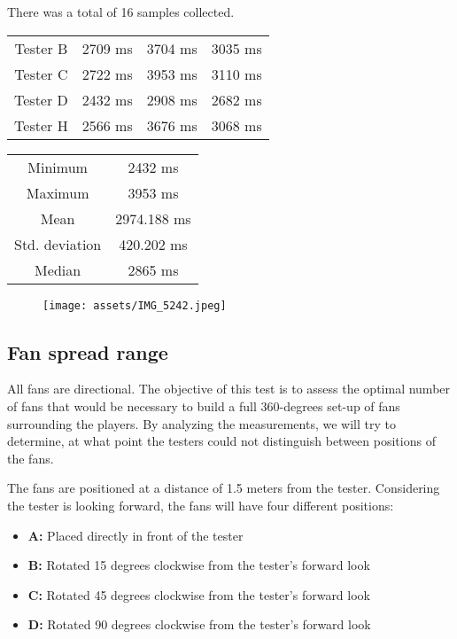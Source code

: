 There was a total of 16 samples collected.


\begin{center}
\begin{tabular}{|c|c|c|c|}
\hline
Tester B & 2709 ms & 3704 ms & 3035 ms \\ 
Tester C & 2722 ms & 3953 ms & 3110 ms \\ 
Tester D & 2432 ms & 2908 ms & 2682 ms \\ 
Tester H & 2566 ms & 3676 ms & 3068 ms \\ 
\hline
\end{tabular}
\end{center}

\begin{center}
\begin{tabular}{|c|c|}
\hline
Minimum & 2432 ms \\ 
Maximum & 3953 ms \\ 
Mean & 2974.188 ms \\ 
Std. deviation & 420.202 ms \\ 
Median & 2865 ms \\ 
\hline
\end{tabular}
\end{center}

\begin{figure}[h]{}
\centering\texttt{[image: assets/IMG\_5242.jpeg]}
\caption{}

\end{figure}

\hypertarget{x-fan-spread-range}{\subsection{Fan spread range}}
All fans are directional. The objective of this test is to assess
the optimal number of fans that would be necessary to build a full 360-degrees
set-up of fans surrounding the players. By analyzing the measurements,
we will try to determine, at what point the testers could not distinguish
between positions of the fans.


The fans are positioned at a distance of 1.5 meters from the tester.
Considering the tester is looking forward, the fans will
have four different positions:


\begin{itemize}

\item \textbf{A:} Placed directly in front of the tester

\item \textbf{B:} Rotated 15 degrees clockwise from the tester’s forward look

\item \textbf{C:} Rotated 45 degrees clockwise from the tester’s forward look

\item \textbf{D:} Rotated 90 degrees clockwise from the tester’s forward look

\end{itemize}


